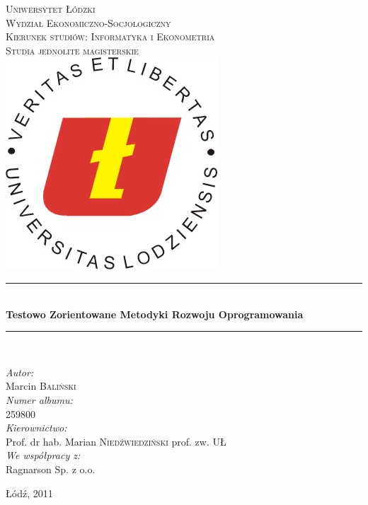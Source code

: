 \begin{titlepage}

\begin{center}
  
\newcommand{\HRule}{\rule{\linewidth}{0.5mm}}

\textsc{\LARGE Uniwersytet Łódzki}\\[0.5cm]

\textsc{\Large Wydział Ekonomiczno-Socjologiczny}\\[0.5cm]

\textsc{\Large Kierunek studiów: Informatyka i Ekonometria}\\[0.5cm]

\textsc{\Large Studia jednolite magisterskie}\\[2cm]

\includegraphics[scale=3.5]{images/ul-logo.jpg}\\[2cm]   



\HRule \\[0.4cm]
{\huge \bfseries Testowo Zorientowane Metodyki Rozwoju Oprogramowania}\\[0.5cm]
\HRule \\[0.4cm]



\begin{minipage}[t]{0.8\textwidth}
\begin{flushleft}
\emph{Autor:}\\
Marcin \textsc{Baliński}\\
\emph{Numer albumu:}\\
\textsc{259800} \\
\emph{Kierownictwo:} \\
Prof. dr hab. Marian \textsc{Niedźwiedziński} prof. zw. UŁ \\[0.5cm]
\emph{We współpracy z:}\\
Ragnarson Sp. z o.o.
\end{flushleft}
\end{minipage}

\vfill

{\large Łódź, 2011}

\end{center}

\end{titlepage}